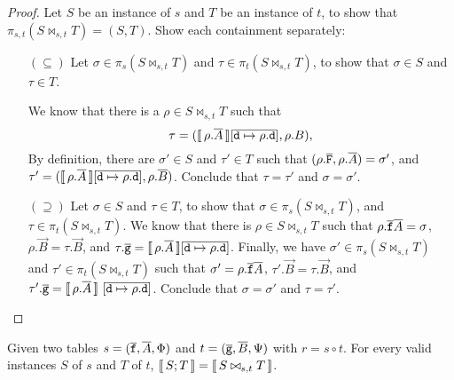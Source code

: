 \begin{proof}
  Let $S$ be an instance of $s$ and $T$ be an instance of $t$, to show
  that $ \pi_{s,t}(S \bowtie_{s,t}T) = (S,T)$. Show each containment
  separately:
  \begin{enumerate}[align=left]
  \item[$(\subseteq)$] Let $\sigma \in \pi_s(S \bowtie_{s,t} T)$ and
    $\tau \in \pi_t(S \bowtie_{s,t} T)$, to show that $\sigma \in S$
    and $\tau \in T$.

    We know that there is a $\rho \in S \bowtie_{s,t} T$ such that
    \[\tau = (\llbracket\,\rho.\overline{A}\,\rrbracket[\overline{\texttt{d} \mapsto \rho.\texttt{d}}],
      \rho.B),\] By definition, there are $\sigma' \in S$ and
    $\tau' \in T$ such that
    $(\rho.\overline{\texttt{F}},\rho.\overline{A}) = \sigma'$, and
    $\tau' = (\llbracket\,\rho.\overline{A}\,\rrbracket[\overline{\texttt{d} \mapsto \rho.\texttt{d}}], \rho.\overline{B})$. Conclude that $\tau = \tau'$ and
    $\sigma = \sigma'$. \hfill \checkmark

  \item[$(\supseteq)$] Let $\sigma \in S$ and $\tau \in T$, to show
    that $\sigma \in \pi_s(S \bowtie_{s,t}T)$, and
    $\tau \in \pi_t(S \bowtie_{s,t} T)$.  We know that there is
    $\rho \in S\bowtie_{s,t}T$ such that
    $\rho.\overline{\texttt{f}}\overline{A} = \sigma$, $\rho.\vec B = \tau.\vec B$,
    and
    $\tau.\overline{\texttt{g}} = \llbracket\,\rho.\overline{A}\,\rrbracket[\overline{\texttt{d} \mapsto
      \rho.\texttt{d}}]$.  Finally, we have
    $\sigma' \in \pi_s(S \bowtie_{s,t}T)$ and
    $\tau' \in \pi_t(S \bowtie_{s,t} T)$ such that
    $\sigma' = \rho.\overline{\texttt{f}}\overline{A}$, $\tau'.\vec B = \tau.\vec B$,
    and
    $\tau'.\overline{\texttt{g}} = \llbracket\,\rho.\overline{A}\,\rrbracket~[\overline{\texttt{d}
      \mapsto \rho.\texttt{d}}]$. Conclude that $\sigma = \sigma'$ and
    $\tau = \tau'$. \hfill \checkmark
  \end{enumerate}
\end{proof}

\begin{theorem}
  \label{thm:comp-func-equiv}
  Given two tables $s = (\overline{\texttt{f}},\overline{A}, \Phi)$ and
  $t = (\overline{\texttt{g}},\overline{B}, \Psi)$ with $r = s \circ t$. For every
  valid instances $S$ of $s$ and $T$ of $t$,
  $\llbracket\,S;T\,\rrbracket = \llbracket\,S\bowtie_{s,t}T\,\rrbracket$.
\end{theorem}


